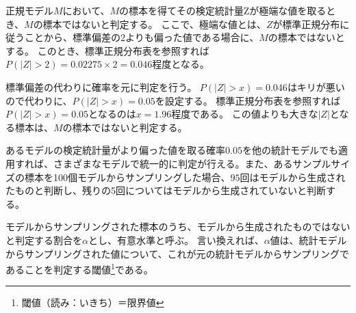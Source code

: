 正規モデル$M$において、$M$の標本を得てその検定統計量Zが極端な値を取るとき、$M$の標本ではないと判定する。
ここで、極端な値とは、$Z$が標準正規分布に従うことから、標準偏差の2よりも偏った値である場合に、$M$の標本ではないとする。
このとき、標準正規分布表を参照すれば$P(|Z|>2)=0.02275\times 2=0.046$程度となる。

標準偏差の代わりに確率を元に判定を行う。
$P(|Z|>x)=0.046$はキリが悪いので代わりに、$P(|Z|>x)=0.05$を設定する。
標準正規分布表を参照すれば$P(|Z|>x)=0.05$となるのは$x=1.96$程度である。
この値よりも大きな$|Z|$となる標本は、$M$の標本ではないと判定する。

あるモデルの検定統計量がより偏った値を取る確率$0.05$を他の統計モデルでも適用すれば、さまざまなモデルで統一的に判定が行える。また、あるサンプルサイズの標本を100個モデルからサンプリングした場合、$95$回はモデルから生成されたものと判断し、残りの5回についてはモデルから生成されていないと判断する。


\begin{defi}
 モデルからサンプリングされた標本のうち、モデルから生成されたものではないと判定する割合を$\alpha$とし、有意水準と呼ぶ。
 言い換えれば、$\alpha$値は、統計モデルからサンプリングされた値について、これが元の統計モデルからサンプリングであることを判定する閾値\footnote{閾値（読み：いきち）＝限界値}である。
\end{defi}







